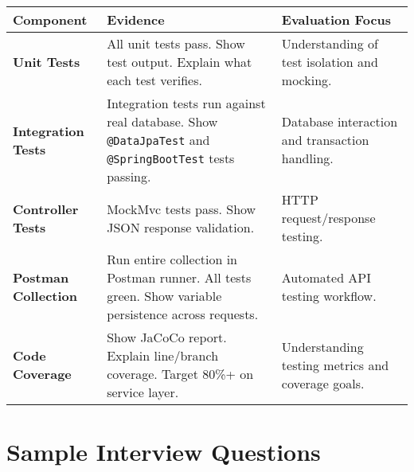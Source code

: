 \documentclass[12pt,a4paper]{article}
\begin{document}
\begin{table}[H]
\centering
\small
\begin{tabularx}{\textwidth}{|l|X|X|}
\toprule
\textbf{Component} & \textbf{Evidence} & \textbf{Evaluation Focus} \\
\midrule
\textbf{Unit Tests} &
All unit tests pass. Show test output. Explain what each test verifies. &
Understanding of test isolation and mocking. \\
\midrule
\textbf{Integration Tests} &
Integration tests run against real database. Show \texttt{@DataJpaTest} and \texttt{@SpringBootTest} tests passing. &
Database interaction and transaction handling. \\
\midrule
\textbf{Controller Tests} &
MockMvc tests pass. Show JSON response validation. &
HTTP request/response testing. \\
\midrule
\textbf{Postman Collection} &
Run entire collection in Postman runner. All tests green. Show variable persistence across requests. &
Automated API testing workflow. \\
\midrule
\textbf{Code Coverage} &
Show JaCoCo report. Explain line/branch coverage. Target 80\%+ on service layer. &
Understanding testing metrics and coverage goals. \\
\bottomrule
\end{tabularx}
\end{table}

\section{Sample Interview Questions}
\end{document}
